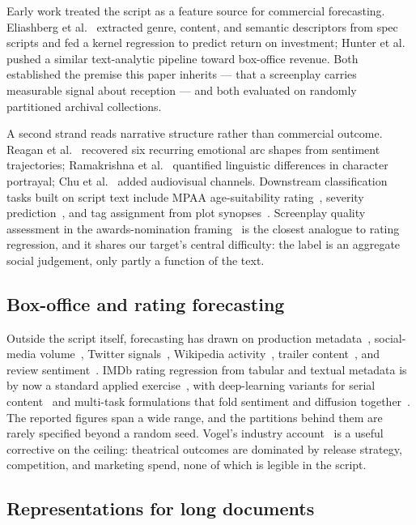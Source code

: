 \documentclass[conference,a4paper]{IEEEtran}
\begin{document}
Early work treated the script as a feature source for commercial
forecasting. Eliashberg et al.~\cite{ref3} extracted genre, content, and
semantic descriptors from spec scripts and fed a kernel regression to
predict return on investment; Hunter et al.~\cite{ref4} pushed a similar
text-analytic pipeline toward box-office revenue. Both established the
premise this paper inherits --- that a screenplay carries measurable
signal about reception --- and both evaluated on randomly partitioned
archival collections.

A second strand reads narrative structure rather than commercial
outcome. Reagan et al.~\cite{ref5} recovered six recurring emotional arc
shapes from sentiment trajectories; Ramakrishna et al.~\cite{ref6}
quantified linguistic differences in character portrayal; Chu et
al.~\cite{ref12} added audiovisual channels. Downstream classification
tasks built on script text include MPAA age-suitability
rating~\cite{ref10,ref34}, severity prediction~\cite{ref11}, and tag
assignment from plot synopses~\cite{ref35}. Screenplay quality assessment
in the awards-nomination framing~\cite{ref38} is the closest analogue to
rating regression, and it shares our target's central difficulty: the
label is an aggregate social judgement, only partly a function of the
text.

\subsection{Box-office and rating forecasting}

Outside the script itself, forecasting has drawn on production
metadata~\cite{ref15}, social-media volume~\cite{ref21,ref23}, Twitter
signals~\cite{ref22}, Wikipedia activity~\cite{ref24}, trailer
content~\cite{ref16}, and review sentiment~\cite{ref18,ref28}. IMDb
rating regression from tabular and textual metadata is by now a standard
applied exercise~\cite{ref17,ref26,ref29}, with deep-learning variants for
serial content~\cite{ref27} and multi-task formulations that fold
sentiment and diffusion together~\cite{ref30}. The reported figures span
a wide range, and the partitions behind them are rarely specified beyond
a random seed. Vogel's industry account~\cite{ref25} is a useful
corrective on the ceiling: theatrical outcomes are dominated by release
strategy, competition, and marketing spend, none of which is legible in
the script.

\subsection{Representations for long documents}
\end{document}
